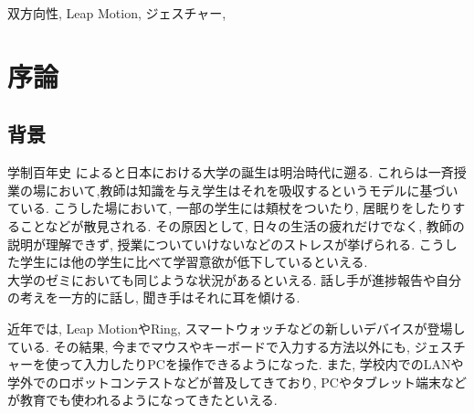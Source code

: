 \documentclass{funthesis}
\begin{document}
\begin{jkeyword}
双方向性, Leap Motion, ジェスチャー, 
\end{jkeyword}

\tableofcontents %


\chapter{序論} %


\section{背景} %


学制百年史\cite{A1} によると日本における大学の誕生は明治時代に遡る. これらは一斉授業の場において,教師は知識を与え学生はそれを吸収するというモデルに基づいている. こうした場において, 一部の学生には頬杖をついたり, 居眠りをしたりすることなどが散見される. その原因として, 日々の生活の疲れだけでなく, 教師の説明が理解できず, 授業についていけないなどのストレスが挙げられる. こうした学生には他の学生に比べて学習意欲が低下しているといえる.\\大学のゼミにおいても同じような状況があるといえる. 話し手が進捗報告や自分の考えを一方的に話し, 聞き手はそれに耳を傾ける. 

近年では, Leap MotionやRing, スマートウォッチなどの新しいデバイスが登場している. その結果, 今までマウスやキーボードで入力する方法以外にも, ジェスチャーを使って入力したりPCを操作できるようになった. また, 学校内でのLANや学外でのロボットコンテストなどが普及してきており,  PCやタブレット端末などが教育でも使われるようになってきたといえる. 
\end{document}

